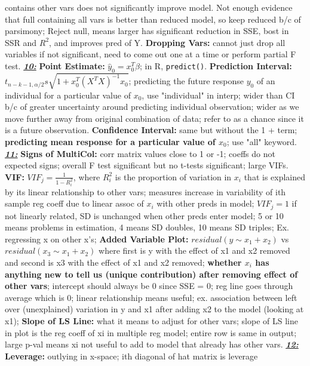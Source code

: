 \documentclass[8pt]{extarticle}
\begin{document}
contains other vars does not significantly improve model. Not enough evidence 
that full containing all vars is better than reduced model, so keep reduced 
b/c of parsimony; Reject null, means larger has significant reduction in SSE, 
bost in SSR and $R^2$, and improves pred of Y.
\textbf{Dropping Vars:} cannot just drop all variables if not significant, need 
to come out one at a time or perform partial F test.
\textit{\textbf{\underline{10:}}}
\textbf{Point Estimate:} $\hat{y}_0 = x^T_0\hat{\beta}$; in R, \texttt{predict()}.
\textbf{Prediction Interval:} $t_{n-k-1, \alpha/2} s \sqrt{1 + x^T_0
(X^TX)^{-1}x_0}$; predicting the future response $y_0$ of an individual for a 
particular value of $x_0$, use "individual" in interp; wider than CI b/c of 
greater uncertainty around predicting individual observation; wider as we move 
further away from original combination of data; refer to as a chance since it 
is a future observation.
\textbf{Confidence Interval:} same but without the 1 + term; \textbf{predicting 
mean response for a particular value of $x_0$}; use "all" keyword.
\textit{\textbf{\underline{11:}}}
\textbf{Signs of MultiCol:} corr matrix values close to 1 or -1; coeffs do not 
expected signs; overall F test significant but no t-tests significant; large 
VIFs. \textbf{VIF:} $VIF_j = \frac{1}{1 - R^2_{i}}$, where $R^2_{i}$ is the proportion 
of variation in $x_i$ that is explained by its linear relationship to other vars; 
measures increase in variability of ith sample reg coeff due to linear assoc of 
$x_i$ with other preds in model; $VIF_j = 1$ if not linearly related, SD is 
unchanged when other preds enter model; 5 or 10 means problems in estimation, 
4 means SD doubles, 10 means SD triples; Ex. regressing x on other x's;
\textbf{Added Variable Plot:} $residual(y\sim x_1+x_2)$ vs $residual(x_3\sim 
x_1+x_2)$ where first is y with the effect of x1 and x2 removed and second is x3 
with the effect of x1 and x2 removed; \textbf{whether $x_i$ has anything new 
to tell us (unique contribution) after removing effect of other vars}; intercept 
should always be 0 since SSE = 0; reg line goes through average which is 0; 
linear relationship means useful; ex. association between left over (unexplained) 
variation in y and x1 after adding x2 to the model (looking at x1); 
\textbf{Slope of LS Line:} what it means to adjust for other vars; slope of LS 
line in plot is the reg coeff of xi in multiple reg model; entire row is same in
output; large p-val means xi not useful to add to model that already has other
vars.
\textit{\textbf{\underline{12:}}}
\textbf{Leverage:} outlying in x-space; ith diagonal of hat matrix is leverage
\end{document}
